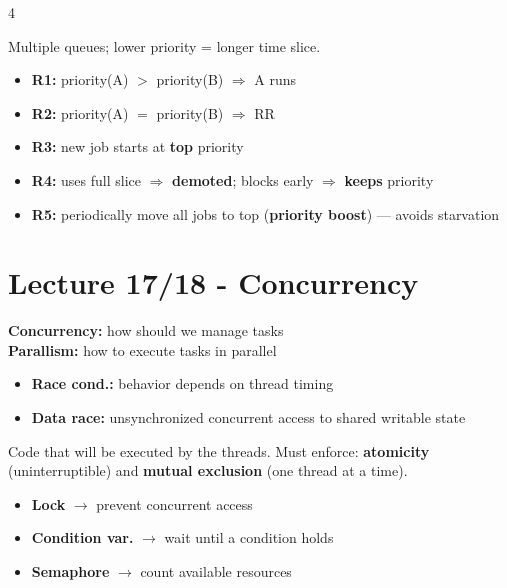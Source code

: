 \documentclass[8pt,a4paper,landscape]{extarticle}
\begin{document}
\begin{multicols*}{4}
\begin{defn}[title=MLFQ (Multi-Level Feedback Queue)]
    Multiple queues; lower priority = longer time slice.
    \begin{itemize}
        \item \textbf{R1:} priority(A) $>$ priority(B) $\Rightarrow$ A runs
        \item \textbf{R2:} priority(A) $=$ priority(B) $\Rightarrow$ RR
        \item \textbf{R3:} new job starts at \textbf{top} priority
        \item \textbf{R4:} uses full slice $\Rightarrow$ \textbf{demoted}; blocks early $\Rightarrow$ \textbf{keeps} priority
        \item \textbf{R5:} periodically move all jobs to top (\textbf{priority boost}) — avoids starvation
    \end{itemize}
\end{defn}

\section{Lecture 17/18 - Concurrency}
\textbf{Concurrency:} how should we manage tasks\\
\textbf{Parallism:} how to execute tasks in parallel

\begin{defn}[title=Race condition \& Data race]
    \begin{itemize}
        \item \textbf{Race cond.:} behavior depends on thread timing
        \item \textbf{Data race:} unsynchronized concurrent access to shared writable state
    \end{itemize}
\end{defn}

\begin{defn}[title=Critical section]
    Code that will be executed by the threads. Must enforce: \textbf{atomicity} (uninterruptible) and \textbf{mutual exclusion} (one thread at a time).
\end{defn}

\begin{warn}[title=Synchronization primitives]
    \begin{itemize}
        \item \textbf{Lock} $\rightarrow$ prevent concurrent access
        \item \textbf{Condition var.} $\rightarrow$ wait until a condition holds
        \item \textbf{Semaphore} $\rightarrow$ count available resources
    \end{itemize}
\end{warn}


\end{multicols*}
\end{document}
